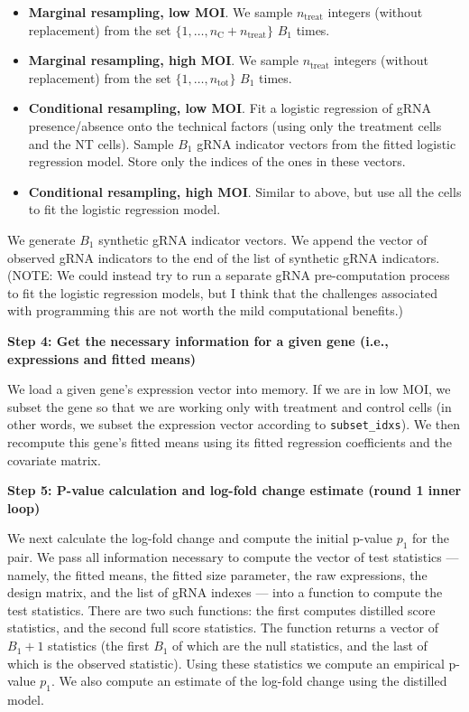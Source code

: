\documentclass[12pt]{article}
\begin{document}
\begin{itemize}
	\item \textbf{Marginal resampling, low MOI}. We sample $n_\textrm{treat}$ integers (without replacement) from the set $\{1, \dots, n_\textrm{C} + n_\textrm{treat} \}$ $B_1$ times.
	\item \textbf{Marginal resampling, high MOI}. We sample $n_\textrm{treat}$ integers (without replacement) from the set $\{ 1, \dots, n_\textrm{tot} \}$ $B_1$ times.
	\item \textbf{Conditional resampling, low MOI}. Fit a logistic regression of gRNA presence/absence onto the technical factors (using only the treatment cells and the NT cells). Sample $B_1$ gRNA indicator vectors from the fitted logistic regression model. Store only the indices of the ones in these vectors.
	\item \textbf{Conditional resampling, high MOI}. Similar to above, but use all the cells to fit the logistic regression model.
\end{itemize}

We generate $B_1$ synthetic gRNA indicator vectors. We append the vector of observed gRNA indicators to the end of the list of synthetic gRNA indicators. (NOTE: We could instead try to run a separate gRNA pre-computation process to fit the logistic regression models, but I think that the challenges associated with programming this are not worth the mild computational benefits.)

\begin{center}
	\textbf{Step 4: Get the necessary information for a given gene (i.e., expressions and fitted means)}
\end{center}

We load a given gene's expression vector into memory. If we are in low MOI, we subset the gene so that we are working only with treatment and control cells (in other words, we subset the expression vector according to \texttt{subset\_idxs}). We then recompute this gene's fitted means using its fitted regression coefficients and the covariate matrix.

\begin{center}
	\textbf{Step 5: P-value calculation and log-fold change estimate (round 1 inner loop)}	
\end{center}

We next calculate the log-fold change and compute the initial p-value $p_1$ for the pair. We pass all information necessary to compute the vector of test statistics --- namely, the fitted means, the fitted size parameter, the raw expressions, the design matrix, and the list of gRNA indexes --- into a function to compute the test statistics. There are two such functions: the first computes distilled score statistics, and the second full score statistics. The function returns a vector of $B_1+1$ statistics (the first $B_1$ of which are the null statistics, and the last of which is the observed statistic). Using these statistics we compute an empirical p-value $p_1$. We also compute an estimate of the log-fold change using the distilled model.
\end{document}
